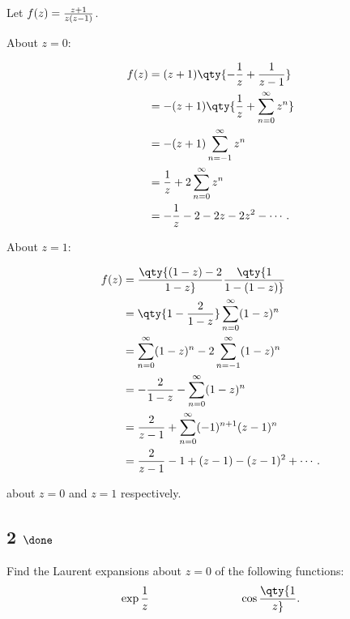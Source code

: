 \begin{solution}

\hfill

\begin{concept}

\hfill

\end{concept}

Let \(f(z) = {z+1\over z(z-1)}\).

About \(z=0\):

\begin{align*} f(z)  &= (z+1) \qty{- {1 \over z} + {1\over z-1} } \\ &=  -(z+1) \qty{{1\over z} + \sum_{n=0}^\infty z^n } \\ &= -(z+1)\sum_{n=-1}^\infty z^n \\ &= {1\over z} + 2\sum_{n=0}^\infty z^n \\ &= -{1\over z} -2 - 2z - 2z^2 - \cdots .\end{align*}

About \(z=1\):

\begin{align*} f(z)  &= \qty{(1-z) -2 \over 1-z} \qty{1 \over 1 - (1-z)} \\ &= \qty{1 - {2\over 1-z}} \sum_{n=0}^\infty (1-z)^n \\  &= \sum_{n=0}^\infty (1-z)^n - 2 \sum_{n=-1}^\infty (1-z)^n \\ &= -{2\over 1-z} - \sum_{n=0}^\infty (1-z)^n \\ &= {2\over z-1} + \sum_{n=0}^\infty (-1)^{n+1} (z-1)^n \\ &= {2\over z-1} - 1 + (z-1) - (z-1)^2 + \cdots .\end{align*}

\end{solution}

about \(z=0\) and \(z=1\) respectively.

\hypertarget{done-7}{%
\subsection{\texorpdfstring{2
\(\done\)}{2 \textbackslash done}}\label{done-7}}

Find the Laurent expansions about \(z=0\) of the following functions:
\begin{align*}
\exp{1\over z} \hspace{8em} \cos \qty{1\over z}
.\end{align*}

